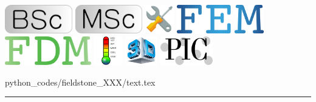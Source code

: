 \noindent
\includegraphics[height=1.25cm]{images/pictograms/bsc}
\includegraphics[height=1.25cm]{images/pictograms/msc}
\includegraphics[height=1.25cm]{images/pictograms/tools}
\includegraphics[height=1.25cm]{images/pictograms/FEM}
\includegraphics[height=1.25cm]{images/pictograms/FDM}
\includegraphics[height=1.25cm]{images/pictograms/temperature}
\includegraphics[height=1.25cm]{images/pictograms/3d}
\includegraphics[height=1.25cm]{images/pictograms/pic}



\begin{flushright} {\tiny {\color{gray} python\_codes/fieldstone\_XXX/text.tex}} \end{flushright}



\par\noindent\rule{\textwidth}{0.4pt}

